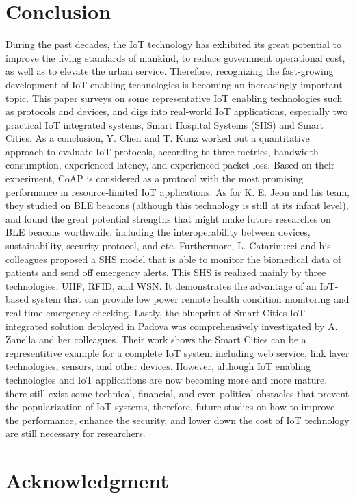 \documentclass[conference]{IEEEtran}
\begin{document}
\section{Conclusion}
During the past decades, the IoT technology has exhibited its great potential to improve the living standards of mankind, to reduce government operational cost, as well as to elevate the urban service. Therefore, recognizing the fast-growing development of IoT enabling technologies is becoming an increasingly important topic. This paper surveys on some representative IoT enabling technologies such as protocols and devices, and digs into real-world IoT applications, especially two practical IoT integrated systems, Smart Hospital Systems (SHS) and Smart Cities. As a conclusion, Y. Chen and T. Kunz worked out a quantitative approach to evaluate IoT protocols, according to three metrics, bandwidth consumption, experienced latency, and experienced packet loss. Based on their experiment, CoAP is considered as a protocol with the most promising performance in resource-limited IoT applications. As for K. E. Jeon and his team, they studied on BLE beacons (although this technology is still at its infant level), and found the great potential strengths that might make future researches on BLE beacons worthwhile, including the interoperability between devices, sustainability, security protocol, and etc. Furthermore, L. Catarinucci and his colleagues proposed a SHS model that is able to monitor the biomedical data of patients and send off emergency alerts. This SHS is realized mainly by three technologies, UHF, RFID, and WSN. It demonstrates the advantage of an IoT-based system that can provide low power remote health condition monitoring and real-time emergency checking. Lastly, the blueprint of Smart Cities IoT integrated solution deployed in Padova was comprehensively investigated by A. Zanella and her colleagues. Their work shows the Smart Cities can be a representitive example for a complete IoT system including web service, link layer technologies, sensors, and other devices. However, although IoT enabling technologies and IoT applications are now becoming more and more mature, there still exist some technical, financial, and even political obstacles that prevent the popularization of IoT systems, therefore, future studies on how to improve the performance, enhance the security, and lower down the cost of IoT technology are still necessary for researchers.

\section*{Acknowledgment}
\end{document}
